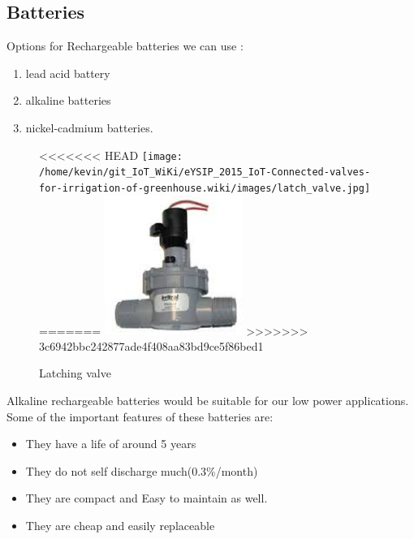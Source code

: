\documentclass[16pt]{article}
\begin{document}
\hfill




\subsection{Batteries}

\hfill


Options for Rechargeable batteries we can use :
\hfill

\begin{enumerate}

\item
  lead acid battery
\item
  alkaline batteries
\item
  nickel-cadmium batteries.
\end{enumerate}

\hfill

\begin{figure}
\hspace{3cm}
<<<<<<< HEAD
\texttt{[image: /home/kevin/git\_IoT\_WiKi/eYSIP\_2015\_IoT-Connected-valves-for-irrigation-of-greenhouse.wiki/images/latch\_valve.jpg]}
=======
\includegraphics[width=0.4\textwidth]{images/latch_valve.jpg}
>>>>>>> 3c6942bbc242877ade4f408aa83bd9ce5f86bed1
\caption{Latching valve}
\end{figure}
\vspace{0.4cm}

Alkaline rechargeable batteries would be suitable for our low power
applications. Some of the important features of these batteries are:
\hfill
\begin{itemize}

\item
  They have a life of around 5 years
\item
  They do not self discharge much(0.3\%/month)
\item
  They are compact and Easy to maintain as well.
\item
  They are cheap and easily replaceable
\end{itemize}
\end{document}
